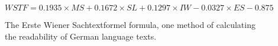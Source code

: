 \begin{figure}[H]
	\caption[Erste Wiener Sachtextformel Formula]{The Erste Wiener Sachtextformel formula, one method of calculating the readability of German language texts. }
	\label{fig:wst}
	\begin{center}
		\begin{math}
		WSTF = 0.1935 \times MS + 0.1672 \times SL + 0.1297 \times IW - 0.0327 \times ES - 0.875
		\end{math}
	\end{center}
\end{figure}